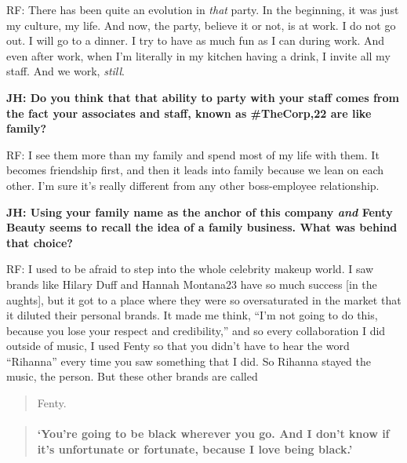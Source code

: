 RF: There has been quite an evolution in \emph{that} party. In the
beginning, it was just my culture, my life. And now, the party, believe
it or not, is at work. I do not go out. I will go to a dinner. I try to
have as much fun as I can during work. And even after work, when I'm
literally in my kitchen having a drink, I invite all my staff. And we
work, \emph{still}.

\textbf{JH: Do you think that that ability to party with your staff
comes from the fact your associates and staff, known as \#TheCorp,22 are
like family?}

RF: I see them more than my family and spend most of my life with them.
It becomes friendship first, and then it leads into family because we
lean on each other. I'm sure it's really different from any other
boss-employee relationship.

\textbf{JH: Using your family name as the anchor of this company
\emph{and} Fenty Beauty seems to recall the idea of a family business.
What was behind that choice?}

RF: I used to be afraid to step into the whole celebrity makeup world. I
saw brands like Hilary Duff and Hannah Montana23 have so much success
{[}in the aughts{]}, but it got to a place where they were so
oversaturated in the market that it diluted their personal brands. It
made me think, ``I'm not going to do this, because you lose your respect
and credibility,'' and so every collaboration I did outside of music, I
used Fenty so that you didn't have to hear the word ``Rihanna'' every
time you saw something that I did. So Rihanna stayed the music, the
person. But these other brands are called

\begin{quote}
Fenty.
\end{quote}

\begin{quote}
\mbox{}%
\hypertarget{youre-going-to-be-black-wherever-you-go-and-i-dont-know-if-its-unfortunate-or-fortunate-because-i-love-being-black}{%
\paragraph{\texorpdfstring{\textbf{`You're going to be black wherever
you go.} \textbf{And I don't know if it's unfortunate} \textbf{or
fortunate, because I love being
black.'}}{`You're going to be black wherever you go. And I don't know if it's unfortunate or fortunate, because I love being black.'}}\label{youre-going-to-be-black-wherever-you-go-and-i-dont-know-if-its-unfortunate-or-fortunate-because-i-love-being-black}}
\end{quote}

